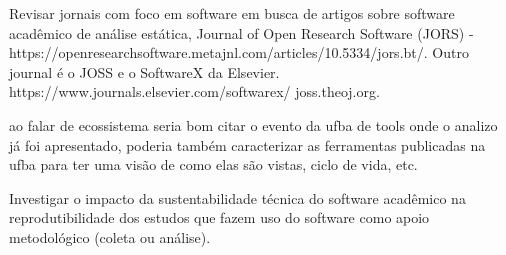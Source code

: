 Revisar jornais com foco em software em busca de artigos sobre
software acadêmico de análise estática, 
Journal of Open Research Software (JORS) -
 https://openresearchsoftware.metajnl.com/articles/10.5334/jors.bt/.
Outro journal é o JOSS e o SoftwareX da Elsevier. https://www.journals.elsevier.com/softwarex/ joss.theoj.org.

ao falar de ecossistema seria bom citar o evento da ufba de tools onde o
analizo já foi apresentado, poderia também caracterizar as ferramentas
publicadas na ufba para ter uma visão de como elas são vistas, ciclo de vida,
etc.

Investigar o impacto da sustentabilidade técnica do software acadêmico na
reprodutibilidade dos estudos que fazem uso do software como apoio metodológico
(coleta ou análise).






